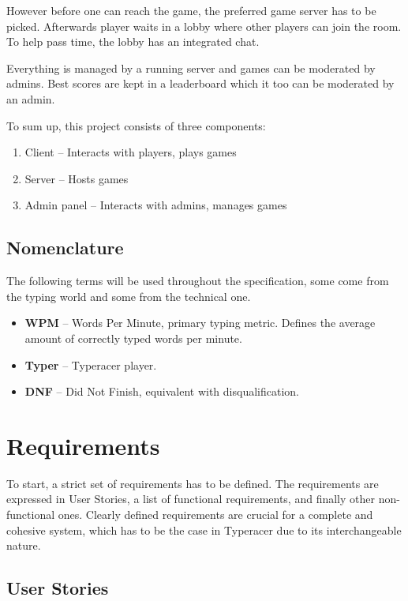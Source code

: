 \documentclass[titlepage]{article}
\begin{document}
However before one can reach the game, the preferred game server has to be picked. Afterwards player waits in a lobby where other players can join the room. To help pass time, the lobby has an integrated chat.

Everything is managed by a running server and games can be moderated by admins. Best scores are kept in a leaderboard which it too can be moderated by an admin.

To sum up, this project consists of three components:

\begin{enumerate}
	\item Client -- Interacts with players, plays games
	\item Server -- Hosts games
	\item Admin panel -- Interacts with admins, manages games
\end{enumerate}

\subsection{Nomenclature} \label{nomenclature}

The following terms will be used throughout the specification, some come from the typing world and some from the technical one.

\begin{itemize}
	\item {\bf WPM} -- Words Per Minute, primary typing metric. Defines the average amount of correctly typed words per minute.

	\item {\bf Typer} -- Typeracer player.

	\item {\bf DNF} -- Did Not Finish, equivalent with disqualification.
\end{itemize}

\section{Requirements}

To start, a strict set of requirements has to be defined. The requirements are expressed in User Stories, a list of functional requirements, and finally other non-functional ones. Clearly defined requirements are crucial for a complete and cohesive system, which has to be the case in Typeracer due to its interchangeable nature.

\subsection{User Stories}
\end{document}
